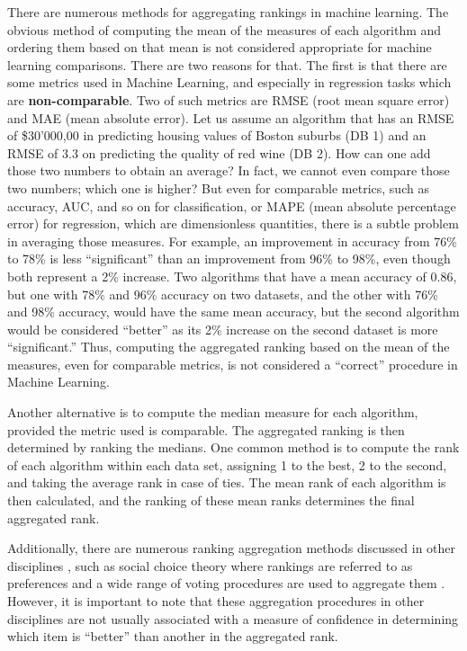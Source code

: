 \documentclass[twoside,11pt,preprint]{article}
\begin{document}
There are numerous methods for aggregating rankings in machine learning. The obvious method of computing the mean of the measures of each algorithm and ordering them based on that mean is not considered appropriate for machine learning comparisons. There are two reasons for that. The first is that there are some metrics used in Machine Learning, and especially in regression tasks which are \textbf{non-comparable}. Two of such metrics are RMSE (root mean square error) and MAE (mean absolute error). Let us assume an algorithm that has an RMSE of \$30'000,00 in predicting housing values of Boston suburbs (DB 1) and an RMSE of 3.3 on predicting the quality of red wine (DB 2). How can one add those two numbers to obtain an average? In fact, we cannot even compare those two numbers; which one is higher? But even for comparable metrics, such as accuracy, AUC, and so on for classification, or MAPE (mean absolute percentage error) for regression, which are dimensionless quantities, there is a subtle problem in averaging those measures. For example, an improvement in accuracy from 76\% to 78\% is less ``significant'' than an improvement from 96\% to 98\%, even though both represent a 2\% increase. Two algorithms that have a mean accuracy of 0.86, but one with 78\% and 96\% accuracy on two datasets, and the other with 76\% and 98\% accuracy, would have the same mean accuracy, but the second algorithm would be considered ``better'' as its 2\% increase on the second dataset is more ``significant.'' Thus, computing the aggregated ranking based on the mean of the measures, even for comparable metrics, is not considered a ``correct'' procedure in Machine Learning.

Another alternative \citep{benavoli2016should, STAPOR2021107219} is to compute the median measure for each algorithm, provided the metric used is comparable. The aggregated ranking is then determined by ranking the medians.
One common method \citep{demsar} is to compute the rank of each algorithm within each data set, assigning 1 to the best, 2 to the second, and taking the average rank in case of ties. The mean rank of each algorithm is then calculated, and the ranking of these mean ranks determines the final aggregated rank.

Additionally, there are numerous ranking aggregation methods discussed in other disciplines \citep{langville2012s}, such as social choice theory where rankings are referred to as preferences and a wide range of voting procedures are used to aggregate them \citep{sep-social-choice}. However, it is important to note that these aggregation procedures in other disciplines are not usually associated with a measure of confidence in determining which item is ``better'' than another in the aggregated rank.
\end{document}
